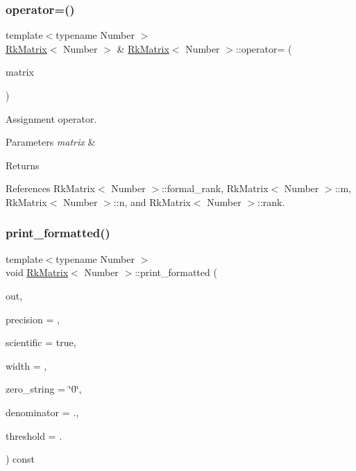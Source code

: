 \subsubsection{\texorpdfstring{operator=()}{operator=()}}
{\footnotesize\ttfamily template$<$typename Number $>$ \\
\hyperlink{classRkMatrix}{Rk\+Matrix}$<$ Number $>$ \& \hyperlink{classRkMatrix}{Rk\+Matrix}$<$ Number $>$\+::operator= (\begin{DoxyParamCaption}\item[{const \hyperlink{classRkMatrix}{Rk\+Matrix}$<$ Number $>$ \&}]{matrix }\end{DoxyParamCaption})}

Assignment operator. 
\begin{DoxyParams}{Parameters}
{\em matrix} & \\
\hline
\end{DoxyParams}
\begin{DoxyReturn}{Returns}

\end{DoxyReturn}


References Rk\+Matrix$<$ Number $>$\+::formal\+\_\+rank, Rk\+Matrix$<$ Number $>$\+::m, Rk\+Matrix$<$ Number $>$\+::n, and Rk\+Matrix$<$ Number $>$\+::rank.

\mbox{\label{classRkMatrix_aeccb86734649be94a64d76cb613eea79}} 
\subsubsection{\texorpdfstring{print\+\_\+formatted()}{print\_formatted()}}
{\footnotesize\ttfamily template$<$typename Number $>$ \\
void \hyperlink{classRkMatrix}{Rk\+Matrix}$<$ Number $>$\+::print\+\_\+formatted (\begin{DoxyParamCaption}\item[{std\+::ostream \&}]{out,  }\item[{const unsigned int}]{precision = {},  }\item[{const bool}]{scientific = {\ttfamily true},  }\item[{const unsigned int}]{width = {},  }\item[{const char $\ast$}]{zero\+\_\+string = {\ttfamily \char`\"{}0\char`\"{}},  }\item[{const double}]{denominator = {.},  }\item[{const double}]{threshold = {.} }\end{DoxyParamCaption}) const}


